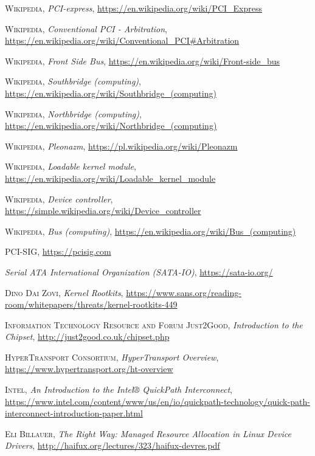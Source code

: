 \documentclass[shortabstract,inz]{iithesis}
\begin{document}
\begin{thebibliography}{1}
 \textsc{Wikipedia}, \textit{PCI-express},
\url{https://en.wikipedia.org/wiki/PCI_Express}

 \textsc{Wikipedia}, \textit{Conventional PCI - Arbitration},
\url{https://en.wikipedia.org/wiki/Conventional_PCI#Arbitration}

 \textsc{Wikipedia}, \textit{Front Side Bus},
\url{https://en.wikipedia.org/wiki/Front-side_bus}

 \textsc{Wikipedia}, \textit{Southbridge (computing)},
\url{https://en.wikipedia.org/wiki/Southbridge_(computing)}

 \textsc{Wikipedia}, \textit{Northbridge (computing)},
\url{https://en.wikipedia.org/wiki/Northbridge_(computing)}

 \textsc{Wikipedia}, \textit{Pleonazm},
\url{https://pl.wikipedia.org/wiki/Pleonazm}

 \textsc{Wikipedia}, \textit{Loadable kernel module},
\url{https://en.wikipedia.org/wiki/Loadable_kernel_module}

 \textsc{Wikipedia}, \textit{Device controller},
\url{https://simple.wikipedia.org/wiki/Device_controller}

 \textsc{Wikipedia}, \textit{Bus (computing)},
\url{https://en.wikipedia.org/wiki/Bus_(computing)}

 \textsc{PCI-SIG},
\url{https://pcisig.com}

 \textit{Serial ATA International Organization (SATA-IO)},
\url{https://sata-io.org/}

 \textsc{Dino Dai Zovi}, \textit{Kernel Rootkits},
\url{https://www.sans.org/reading-room/whitepapers/threats/kernel-rootkits-449}

 \textsc{Information Technology Resource and Forum Just2Good},
\textit{Introduction to the Chipset},
\url{http://just2good.co.uk/chipset.php}

 \textsc{HyperTransport Consortium}, \textit{HyperTransport Overview},
\url{https://www.hypertransport.org/ht-overview}

 \textsc{Intel}, \textit{An Introduction to the Intel® QuickPath Interconnect},
\url{https://www.intel.com/content/www/us/en/io/quickpath-technology/quick-path-interconnect-introduction-paper.html}

 \textsc{Eli Billauer}, \textit{The Right Way: Managed Resource Allocation in
Linux Device Drivers},
\url{http://haifux.org/lectures/323/haifux-devres.pdf}


\end{thebibliography}
\end{document}
